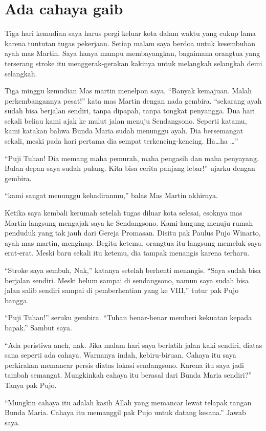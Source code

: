 \section*{Ada cahaya gaib}
	Tiga hari kemudian saya harus pergi keluar kota dalam waktu yang cukup lama karena tuntutan tugas pekerjaan. Setiap malam saya berdoa untuk kesembuhan ayah mas Martin. Saya hanya mampu membayangkan, bagaimana orangtua yang terserang stroke itu menggerak-gerakan kakinya untuk melangkah selangkah demi selangkah.

	Tiga minggu kemudian Mas martin menelpon saya, “Banyak kemajuan. Malah perkembangannya pesat!” kata mas Martin dengan nada gembira. “sekarang ayah sudah bisa berjalan sendiri, tanpa dipapah, tanpa tongkat penyangga. Dua hari sekali beliau kami ajak ke mulut jalan menuju Sendangsono. Seperti katamu, kami katakan bahwa Bunda Maria sudah menunggu ayah. Dia bersemangat sekali, meski pada hari pertama dia sempat terkencing-kencing. Ha\ldots ha \ldots”

	“Puji Tuhan! Dia memang maha pemurah, maha pengasih dan maha penyayang. Bulan depan saya sudah pulang. Kita bisa cerita panjang lebar!” ujarku dengan gembira.

	“kami sangat menunggu kehadiranmu,” balas Mas Martin akhirnya.

	Ketika saya kembali kerumah setelah tugas diluar kota selesai, esoknya mas Martin langsung mengajak saya ke Sendangsono. Kami langung menuju rumah penduduk  yang tak jauh dari Gereja Promasan. Disitu pak Paulus Pujo Winarto, ayah mas martin, menginap. Begitu ketemu, orangtua itu langsung memeluk saya erat-erat. Meski baru sekali itu ketemu, dia tampak menangis karena terharu.

	“Stroke saya sembuh, Nak,” katanya setelah berhenti menangis. “Saya sudah bisa berjalan sendiri. Meski belum sampai di sendangsono, namun saya sudah bisa jalan salib sendiri sampai di pemberhentian yang ke VIII,” tutur pak Pujo bangga.

	“Puji Tuhan!” seruku gembira. “Tuhan benar-benar memberi kekuatan kepada bapak.” Sambut saya.

	“Ada peristiwa aneh, nak. Jika malam hari saya berlatih jalan kaki sendiri, diatas sana seperti ada cahaya. Warnanya indah, kebiru-biruan. Cahaya itu saya perkirakan memancar persis diatas lokasi sendangsono. Karena itu saya jadi tambah semangat. Mungkinkah cahaya itu berasal dari Bunda Maria sendiri?” Tanya pak Pujo.

	“Mungkin cahaya itu adalah kasih Allah yang memancar lewat telapak tangan Bunda Maria. Cahaya itu memanggil pak Pujo untuk datang kesana.” Jawab saya.

